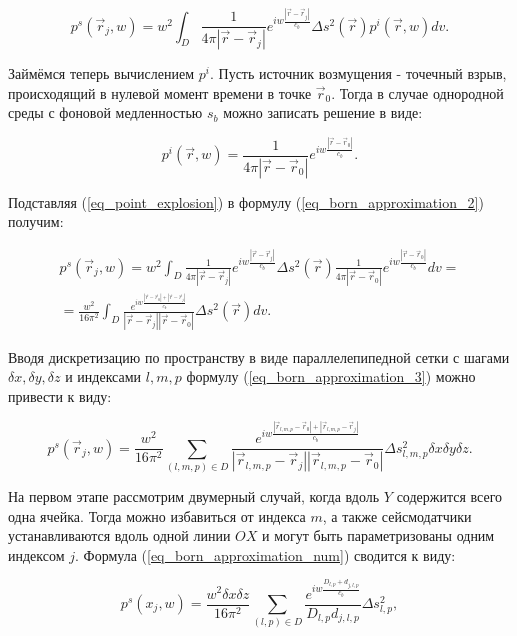 \documentclass{article}
\begin{document}
\begin{equation}
\label{eq_born_approximation_2}
p^s(\vec{r}_j, w) = w^2\int_D \frac{1}{4\pi|\vec{r}-\vec{r}_j|}e^{iw\frac{|\vec{r}-\vec{r}_j|}{c_b}} \Delta s^2(\vec{r})p^i(\vec{r},w)  dv.
\end{equation}

Займёмся теперь вычислением $p^i$.
Пусть источник возмущения - точечный взрыв, происходящий в нулевой момент времени в точке $\vec{r}_0$.
Тогда в случае однородной среды с фоновой медленностью $s_b$ можно записать решение в виде:

\begin{equation}
\label{eq_point_explosion}
p^i(\vec{r}, w) = \frac{1}{4\pi|\vec{r}-\vec{r}_0|}e^{iw\frac{|\vec{r}-\vec{r}_0|}{c_b}}.
\end{equation}

Подставляя (\ref{eq_point_explosion}) в формулу (\ref{eq_born_approximation_2}) получим:

\begin{eqnarray}
\label{eq_born_approximation_3}
p^s(\vec{r}_j, w) = w^2\int_D \frac{1}{4\pi|\vec{r}-\vec{r}_j|}e^{iw\frac{|\vec{r}-\vec{r}_j|}{c_b}} \Delta s^2(\vec{r})\frac{1}{4\pi|\vec{r}-\vec{r}_0|}e^{iw\frac{|\vec{r}-\vec{r}_0|}{c_b}}  dv = \nonumber \\
= \frac{w^2}{16\pi^2} \int_D \frac{e^{iw\frac{|\vec{r}-\vec{r}_0| + |\vec{r}-\vec{r}_j|}{c_b}}}{|\vec{r}-\vec{r}_j||\vec{r}-\vec{r}_0|} \Delta s^2(\vec{r}) dv.
\end{eqnarray}

Вводя дискретизацию по пространству в виде параллелепипедной сетки с шагами $\delta x, \delta y, \delta z$ и индексами $l, m, p$ формулу (\ref{eq_born_approximation_3}) можно
привести к виду:

\begin{equation}
\label{eq_born_approximation_num}
p^s(\vec{r}_j, w) = \frac{w^2}{16\pi^2} \sum_{(l,m,p)\in D} \frac{e^{iw\frac{|\vec{r}_{l,m,p}-\vec{r}_0| + |\vec{r}_{l,m,p}-\vec{r}_j|}{c_b}}}{|\vec{r}_{l,m,p}-\vec{r}_j||\vec{r}_{l,m,p}-\vec{r}_0|} \Delta s_{l,m,p}^2 \delta x \delta y \delta z.
\end{equation}

На первом этапе рассмотрим двумерный случай, когда вдоль $Y$ содержится всего одна ячейка.
Тогда можно избавиться от индекса $m$, а также сейсмодатчики устанавливаются вдоль одной линии $OX$ и могут быть параметризованы одним индексом $j$.
Формула (\ref{eq_born_approximation_num}) сводится к виду:

\begin{equation}
\label{eq_born_approximation_num_2D}
p^s(x_j, w) = \frac{w^2 \delta x \delta z}{16\pi^2} \sum_{(l,p)\in D} \frac{e^{iw\frac{D_{l,p}+d_{j,l,p}}{c_b}}}{D_{l,p}d_{j,l,p}} \Delta s_{l,p}^2,
\end{equation}
\end{document}

